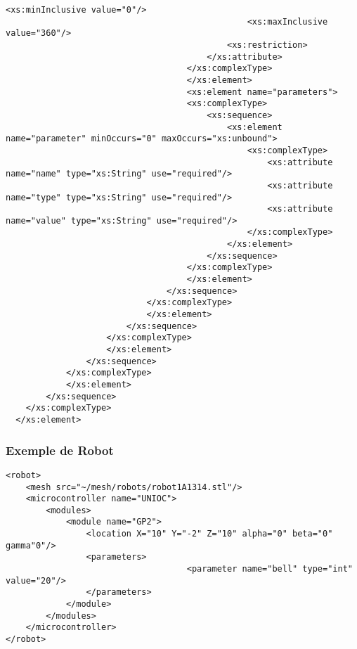 \begin{changemargin}{-1cm}{-1cm}
\begin{lstlisting}[caption=Description du Robot, label=descbot]
                                                <xs:minInclusive value="0"/>
                                                <xs:maxInclusive value="360"/>
                                            <xs:restriction>
                                        </xs:attribute>
                                    </xs:complexType>
                                    </xs:element>
                                    <xs:element name="parameters">
                                    <xs:complexType>
                                        <xs:sequence>
                                            <xs:element name="parameter" minOccurs="0" maxOccurs="xs:unbound">
                                                <xs:complexType>
                                                    <xs:attribute name="name" type="xs:String" use="required"/>
                                                    <xs:attribute name="type" type="xs:String" use="required"/>
                                                    <xs:attribute name="value" type="xs:String" use="required"/>
                                                </xs:complexType>
                                            </xs:element>
                                        </xs:sequence>
                                    </xs:complexType>
                                    </xs:element>
                                </xs:sequence>
                            </xs:complexType>
                            </xs:element>
                        </xs:sequence>
                    </xs:complexType>
                    </xs:element>
                </xs:sequence>
            </xs:complexType>
            </xs:element>
        </xs:sequence>
    </xs:complexType>
  </xs:element>
  \end{lstlisting}
\end{changemargin}

\subsubsection{Exemple de Robot}
\begin{lstlisting}[caption=Exemple de Robot, label=exrobot]
<robot>
	<mesh src="~/mesh/robots/robot1A1314.stl"/>
	<microcontroller name="UNIOC">
		<modules>
			<module name="GP2">
				<location X="10" Y="-2" Z="10" alpha="0" beta="0" gamma"0"/>
				<parameters>
                                	<parameter name="bell" type="int" value="20"/>
				</parameters>
			</module>
		</modules>
	</microcontroller>
</robot>
\end{lstlisting}
  
